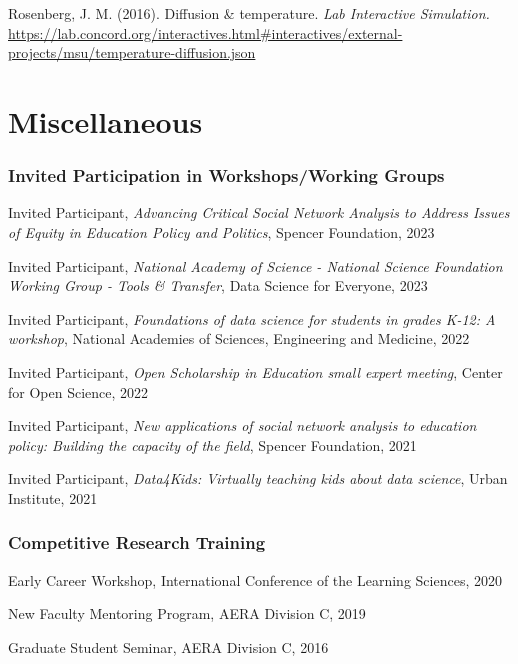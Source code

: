 \documentclass[
  14,
]{article}
\begin{document}
Rosenberg, J. M. (2016). Diffusion \& temperature. \emph{Lab Interactive
Simulation.}
\url{https://lab.concord.org/interactives.html\#interactives/external-projects/msu/temperature-diffusion.json}

\hypertarget{miscellaneous}{%
\section{Miscellaneous}\label{miscellaneous}}

\hypertarget{invited-participation-in-workshopsworking-groups}{%
\subsubsection{Invited Participation in Workshops/Working
Groups}\label{invited-participation-in-workshopsworking-groups}}

Invited Participant, \emph{Advancing Critical Social Network Analysis to
Address Issues of Equity in Education Policy and Politics}, Spencer
Foundation, 2023

Invited Participant, \emph{National Academy of Science - National
Science Foundation Working Group - Tools \& Transfer}, Data Science for
Everyone, 2023

Invited Participant, \emph{Foundations of data science for students in
grades K-12: A workshop}, National Academies of Sciences, Engineering
and Medicine, 2022

Invited Participant, \emph{Open Scholarship in Education small expert
meeting}, Center for Open Science, 2022

Invited Participant, \emph{New applications of social network analysis
to education policy: Building the capacity of the field}, Spencer
Foundation, 2021

Invited Participant, \emph{Data4Kids: Virtually teaching kids about data
science}, Urban Institute, 2021

\hypertarget{competitive-research-training}{%
\subsubsection{Competitive Research
Training}\label{competitive-research-training}}

Early Career Workshop, International Conference of the Learning
Sciences, 2020

New Faculty Mentoring Program, AERA Division C, 2019

Graduate Student Seminar, AERA Division C, 2016
\end{document}
